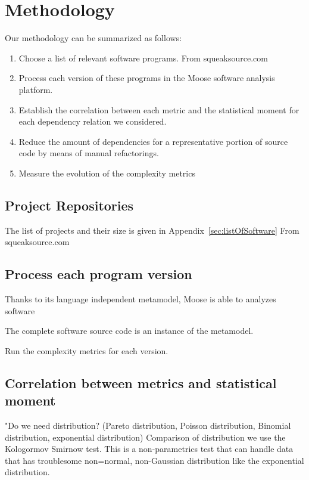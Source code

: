 \documentclass{sig-alternate}
\newcommand{\seclabel}[1]{\label{sec:#1}}
\newcommand{\appref}[1]{Appendix~\ref{sec:#1}}
\begin{document}
\section{Methodology}\seclabel{methodology}

Our methodology can be summarized as follows:

\begin{enumerate}
\item Choose a list of relevant software programs. From squeaksource.com
\item Process each version of these programs in the Moose software analysis platform. 
\item Establish the correlation between each metric and the statistical moment for each dependency relation we considered.
\item Reduce the amount of dependencies for a representative portion of source code by means of manual refactorings.
\item Measure the evolution of the complexity metrics
\end{enumerate}

\subsection{Project Repositories}

The list of projects and their size is given in \appref{listOfSoftware}
From squeaksource.com


\subsection{Process each program version}

Thanks to its language independent metamodel, Moose is able to analyzes software

The complete software source code is an instance of the metamodel.

Run the complexity metrics for each version.

\subsection{Correlation between metrics and statistical moment}

"Do we need distribution? (Pareto distribution, Poisson distribution, Binomial distribution, exponential distribution)
Comparison of distribution we use the Kologormov Smirnow test. This is a non-parametrics test that can handle data that has troublesome non=normal, non-Gaussian distribution like the exponential distribution.
\end{document}

